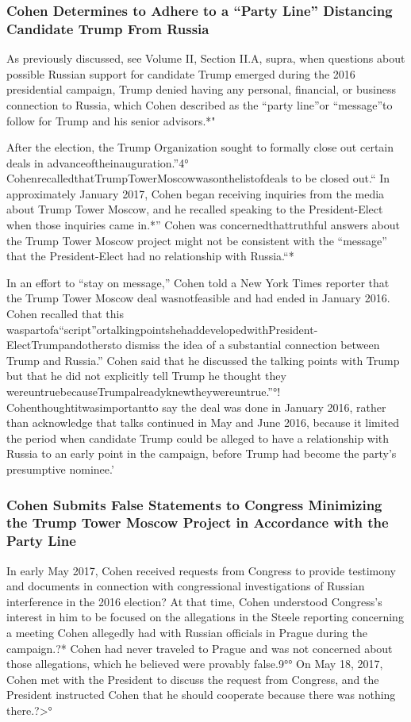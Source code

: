 \subsubsection{Cohen Determines to Adhere to a “Party Line” Distancing Candidate Trump From Russia}

As previously discussed, see Volume II, Section II.A, supra, when questions about possible Russian support for candidate Trump emerged during the 2016 presidential campaign, Trump denied having any personal, financial, or business connection to Russia, which Cohen described as the “party line”or “message”to follow for Trump and his senior advisors.*"

After the election, the Trump Organization sought to formally close out certain deals in advanceoftheinauguration.”4°
CohenrecalledthatTrumpTowerMoscowwasonthelistofdeals to be closed out.“
In approximately January 2017, Cohen began receiving inquiries from the media about Trump Tower Moscow, and he recalled speaking to the President-Elect when those inquiries came in.*”
Cohen was concernedthattruthful answers about the Trump Tower Moscow project might not be consistent with the “message” that the President-Elect had no relationship with Russia.“*

In an effort to “stay on message,” Cohen told a New York Times reporter that the Trump Tower Moscow deal wasnotfeasible and had ended in January 2016.
Cohen recalled that this waspartofa“script”ortalkingpointshehaddevelopedwithPresident-ElectTrumpandothersto
dismiss the idea of a substantial connection between Trump and Russia.”
Cohen said that he discussed the talking points with Trump but that he did not explicitly tell Trump he thought they wereuntruebecauseTrumpalreadyknewtheywereuntrue.”°!
Cohenthoughtitwasimportantto say the deal was done in January 2016, rather than acknowledge that talks continued in May and June 2016, because it limited the period when candidate Trump could be alleged to have a relationship with Russia to an early point in the campaign, before Trump had become the party's presumptive nominee.'

\subsubsection{Cohen Submits False Statements to Congress Minimizing the Trump Tower Moscow Project in Accordance with the Party Line}

In early May 2017, Cohen received requests from Congress to provide testimony and documents in connection with congressional investigations of Russian interference in the 2016 election?
At that time, Cohen understood Congress's interest in him to be focused on the allegations in the Steele reporting concerning a meeting Cohen allegedly had with Russian officials in Prague during the campaign.?*
Cohen had never traveled to Prague and was not concerned about those allegations, which he believed were provably false.9°°
On May 18, 2017, Cohen met with the President to discuss the request from Congress, and the President instructed Cohen that he should cooperate because there was nothing there.?>°

